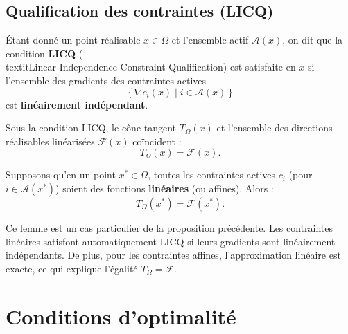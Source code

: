 \subsection{Qualification des contraintes (LICQ)}

\begin{definition}
    Étant donné un point réalisable $x \in \Omega$ et l'ensemble actif $\mathcal{A}(x)$, on dit que la condition \textbf{LICQ} (\\textit{Linear Independence Constraint Qualification}) est satisfaite en $x$ si l'ensemble des gradients des contraintes actives
    \begin{equation}
        \left\{ \nabla c_i(x) \mid i \in \mathcal{A}(x) \right\}
    \end{equation}
    est \textbf{linéairement indépendant}.
\end{definition}

\begin{proposition}
    Sous la condition LICQ, le cône tangent $T_\Omega(x)$ et l'ensemble des directions réalisables linéarisées $\mathcal{F}(x)$ coïncident :
    \begin{equation}
        T_\Omega(x) = \mathcal{F}(x).
    \end{equation}
\end{proposition}

\begin{lemme}
    Supposons qu'en un point $x^* \in \Omega$, toutes les contraintes actives $c_i$ (pour $i \in \mathcal{A}(x^*)$) soient des fonctions \textbf{linéaires} (ou affines). Alors :
    \begin{equation}
        T_\Omega(x^*) = \mathcal{F}(x^*).
    \end{equation}
\end{lemme}

\begin{remarque}
    Ce lemme est un cas particulier de la proposition précédente. Les contraintes linéaires satisfont automatiquement LICQ si leurs gradients sont linéairement indépendants. De plus, pour les contraintes affines, l'approximation linéaire est exacte, ce qui explique l'égalité $T_\Omega = \mathcal{F}$.
\end{remarque}

\section{Conditions d'optimalité}

